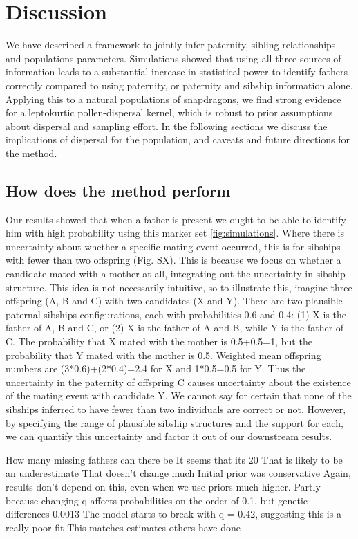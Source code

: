 \documentclass[10pt, a4paper, twocolumn]{article} %
\begin{document}
\section{Discussion}

We have described a framework to jointly infer paternity, sibling relationships and populations parameters. Simulations showed that using all three sources of information leads to a substantial increase in statistical power to identify fathers correctly compared to using paternity, or paternity and sibship information alone. Applying this to a natural populations of snapdragons, we find strong evidence for a leptokurtic pollen-dispersal kernel, which is robust to prior assumptions about dispersal and sampling effort. In the following sections we discuss the implications of dispersal for the population, and caveats and future directions for the method.

\subsection{How does the method perform}

Our results showed that when a father is present we ought to be able to identify him with high probability using this marker set \ref{fig:simulations}.
Where there is uncertainty about whether a specific mating event occurred, this is for sibships with fewer than two offspring (Fig. SX).
This is because we focus on whether a candidate mated with a mother at all, integrating out the uncertainty in sibship structure.
This idea is not necessarily intuitive, so to illustrate this, imagine three offspring (A, B and C) with two candidates (X and Y).
There are two plausible paternal-sibships configurations, each with probabilities 0.6 and 0.4: (1) X is the father of A, B and C, or (2) X is the father of A and B, while Y is the father of C.
The probability that X mated with the mother is 0.5+0.5=1, but the probability that Y mated with the mother is 0.5.
Weighted mean offspring numbers are (3*0.6)+(2*0.4)=2.4 for X and 1*0.5=0.5 for Y.
Thus the uncertainty in the paternity of offspring C causes uncertainty about the existence of the mating event with candidate Y.
We cannot say for certain that none of the sibships inferred to have fewer than two individuals are correct or not.
However, by specifying the range of plausible sibship structures and the support for each, we can quantify this uncertainty and factor it out of our downstream results.

How many missing fathers can there be
It seems that its 20%
That is likely to be an underestimate
That doesn't change much
Initial prior was conservative
Again, results don't depend on this, even when we use priors much higher.
Partly because changing q affects probabilities on the order of 0.1, but genetic differences 0.0013
The model starts to break with q = 0.42, suggesting this is a really poor fit
This matches estimates others have done
\end{document}
